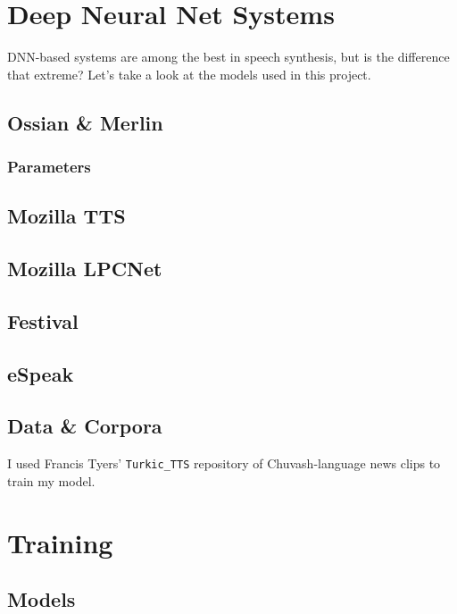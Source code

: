 \documentclass[11pt,a4paper]{article}
\begin{document}
\section{Deep Neural Net Systems}\label{sect:dnn}
DNN-based systems are among the best in speech synthesis, but is the difference that extreme? Let's take a look at the models used in this project.

\subsection{Ossian \& Merlin}\label{ssec:ossian}

\subsubsection{Parameters}

\subsection{Mozilla TTS}\label{ssec:mozillaTTS}

\subsection{Mozilla LPCNet}\label{ssec:lpcnet}

\subsection{Festival}\label{ssec:festival}

\subsection{eSpeak}\label{ssec:espeak}

\subsection{Data \& Corpora}\label{ssec:data}

I used Francis Tyers' \texttt{Turkic\_TTS} repository of Chuvash-language news clips to train my model.

\section{Training}


\subsection{Models}\label{ssec:models}
\end{document}
